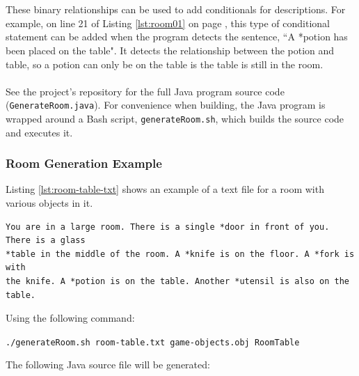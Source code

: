 \documentclass[11pt]{article}
\begin{document}
\\
\\
These binary relationships can be used to add conditionals for descriptions. For example, on line 21 of Listing \ref{lst:room01} on page \pageref{lst:room01}, this type of conditional statement can be added when the program detects the sentence, ``A *potion has been placed on the table". It detects the relationship between the potion and table, so a potion can only be on the table is the table is still in the room.
\\
\\
See the project's repository for the full Java program source code (\texttt{GenerateRoom.java}). For convenience when building, the Java program is wrapped around a Bash script, \texttt{generateRoom.sh}, which builds the source code and executes it.

\subsubsection{Room Generation Example}

Listing \ref{lst:room-table-txt} shows an example of a text file for a room with various objects in it.

\begin{lstlisting}[caption=room-table.txt, label=lst:room-table-txt]
You are in a large room. There is a single *door in front of you. There is a glass
*table in the middle of the room. A *knife is on the floor. A *fork is with
the knife. A *potion is on the table. Another *utensil is also on the table.
\end{lstlisting}

Using the following command:

\begin{center}
\texttt{./generateRoom.sh room-table.txt game-objects.obj RoomTable}
\end{center}

The following Java source file will be generated:
\end{document}
